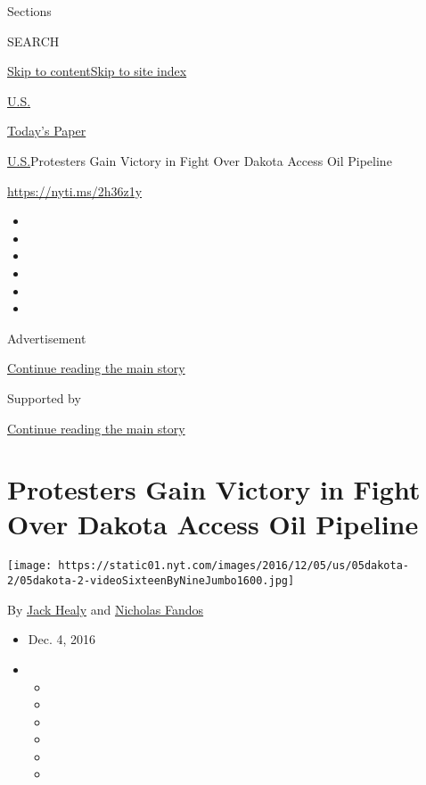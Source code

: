 Sections

SEARCH

\protect\hyperlink{site-content}{Skip to
content}\protect\hyperlink{site-index}{Skip to site index}

\href{https://www.nytimes.com/section/us}{U.S.}

\href{https://myaccount.nytimes.com/auth/login?response_type=cookie\&client_id=vi}{}

\href{https://www.nytimes.com/section/todayspaper}{Today's Paper}

\href{/section/us}{U.S.}\textbar{}Protesters Gain Victory in Fight Over
Dakota Access Oil Pipeline

\url{https://nyti.ms/2h36z1y}

\begin{itemize}
\item
\item
\item
\item
\item
\item
\end{itemize}

Advertisement

\protect\hyperlink{after-top}{Continue reading the main story}

Supported by

\protect\hyperlink{after-sponsor}{Continue reading the main story}

\hypertarget{protesters-gain-victory-in-fight-over-dakota-access-oil-pipeline}{%
\section{Protesters Gain Victory in Fight Over Dakota Access Oil
Pipeline}\label{protesters-gain-victory-in-fight-over-dakota-access-oil-pipeline}}

\texttt{[image: https://static01.nyt.com/images/2016/12/05/us/05dakota-2/05dakota-2-videoSixteenByNineJumbo1600.jpg]}

By \href{https://www.nytimes.com/by/jack-healy}{Jack Healy} and
\href{https://www.nytimes.com/by/nicholas-fandos}{Nicholas Fandos}

\begin{itemize}
\item
  Dec. 4, 2016
\item
  \begin{itemize}
  \item
  \item
  \item
  \item
  \item
  \item
  \end{itemize}
\end{itemize}

